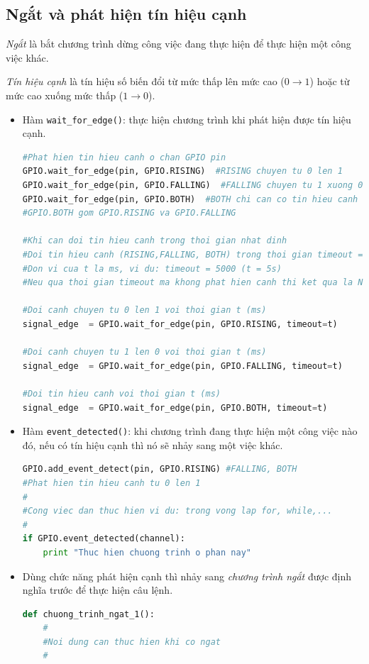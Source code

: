 \subsection{Ngắt và phát hiện tín hiệu cạnh}
\textit{Ngắt} là bắt chương trình dừng công việc đang thực hiện để thực hiện một công việc khác.

\textit{Tín hiệu cạnh} là tín hiệu số biến đổi từ mức thấp lên mức cao ($0 \rightarrow 1$) hoặc từ mức cao xuống mức thấp ($1 \rightarrow 0$).
\begin{itemize}
\item Hàm \verb|wait_for_edge()|: thực hiện chương trình khi phát hiện được tín hiệu cạnh.
\begin{lstlisting}[language=Python]
#Phat hien tin hieu canh o chan GPIO pin
GPIO.wait_for_edge(pin, GPIO.RISING)  #RISING chuyen tu 0 len 1
GPIO.wait_for_edge(pin, GPIO.FALLING)  #FALLING chuyen tu 1 xuong 0
GPIO.wait_for_edge(pin, GPIO.BOTH)  #BOTH chi can co tin hieu canh
#GPIO.BOTH gom GPIO.RISING va GPIO.FALLING

#Khi can doi tin hieu canh trong thoi gian nhat dinh
#Doi tin hieu canh (RISING,FALLING, BOTH) trong thoi gian timeout = t
#Don vi cua t la ms, vi du: timeout = 5000 (t = 5s)
#Neu qua thoi gian timeout ma khong phat hien canh thi ket qua la None

#Doi canh chuyen tu 0 len 1 voi thoi gian t (ms)
signal_edge  = GPIO.wait_for_edge(pin, GPIO.RISING, timeout=t) 

#Doi canh chuyen tu 1 len 0 voi thoi gian t (ms)
signal_edge  = GPIO.wait_for_edge(pin, GPIO.FALLING, timeout=t) 

#Doi tin hieu canh voi thoi gian t (ms)
signal_edge  = GPIO.wait_for_edge(pin, GPIO.BOTH, timeout=t) 
\end{lstlisting}
\item Hàm \verb|event_detected()|: khi chương trình đang thực hiện một công việc nào đó, nếu có tín hiệu cạnh thì nó sẽ nhảy sang một việc khác.
\begin{lstlisting}[language=Python]
GPIO.add_event_detect(pin, GPIO.RISING) #FALLING, BOTH
#Phat hien tin hieu canh tu 0 len 1
#
#Cong viec dan thuc hien vi du: trong vong lap for, while,...
#
if GPIO.event_detected(channel):
	print "Thuc hien chuong trinh o phan nay"
\end{lstlisting}
\item Dùng chức năng phát hiện cạnh thì nhảy sang \textit{chương trình ngắt} được định nghĩa trước để thực hiện câu lệnh.
\begin{lstlisting}[language=Python]
def chuong_trinh_ngat_1():
	#
	#Noi dung can thuc hien khi co ngat
	#


\end{lstlisting}
\end{itemize}
